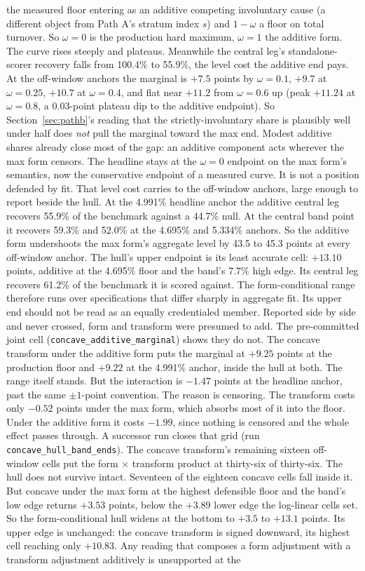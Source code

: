 \documentclass[12pt]{article}
\begin{document}
the measured floor entering as an additive competing involuntary cause (a different object from Path A's stratum index $s$) and $1-\omega$ a floor on total turnover. So $\omega = 0$ is the production hard maximum, $\omega = 1$ the additive form. The curve rises steeply and plateaus. Meanwhile the central leg's standalone-scorer recovery falls from 100.4\% to 55.9\%, the level cost the additive end pays. At the off-window anchors the marginal is $+7.5$ points by $\omega = 0.1$, $+9.7$ at $\omega = 0.25$, $+10.7$ at $\omega = 0.4$, and flat near $+11.2$ from $\omega = 0.6$ up (peak $+11.24$ at $\omega = 0.8$, a 0.03-point plateau dip to the additive endpoint). So Section~\ref{sec:pathb}'s reading that the strictly-involuntary share is plausibly well under half does \emph{not} pull the marginal toward the max end. Modest additive shares already close most of the gap: an additive component acts wherever the max form censors. The headline stays at the $\omega = 0$ endpoint on the max form's semantics, now the conservative endpoint of a measured curve. It is not a position defended by fit. That level cost carries to the off-window anchors, large enough to report beside the hull. At the 4.991\% headline anchor the additive central leg recovers 55.9\% of the benchmark against a 44.7\% null. At the central band point it recovers 59.3\% and 52.0\% at the 4.695\% and 5.334\% anchors. So the additive form undershoots the max form's aggregate level by 43.5 to 45.3 points at every off-window anchor. The hull's upper endpoint is its least accurate cell: $+13.10$ points, additive at the 4.695\% floor and the band's 7.7\% high edge. Its central leg recovers 61.2\% of the benchmark it is scored against. The form-conditional range therefore runs over specifications that differ sharply in aggregate fit. Its upper end should not be read as an equally credentialed member. Reported side by side and never crossed, form and transform were presumed to add. The pre-committed joint cell (\texttt{concave\_additive\_marginal}) shows they do not. The concave transform under the additive form puts the marginal at $+9.25$ points at the production floor and $+9.22$ at the 4.991\% anchor, inside the hull at both. The range itself stands. But the interaction is $-1.47$ points at the headline anchor, past the same $\pm 1$-point convention. The reason is censoring. The transform costs only $-0.52$ points under the max form, which absorbs most of it into the floor. Under the additive form it costs $-1.99$, since nothing is censored and the whole effect passes through. A successor run closes that grid (run \texttt{concave\_hull\_band\_ends}). The concave transform's remaining sixteen off-window cells put the form $\times$ transform product at thirty-six of thirty-six. The hull does not survive intact. Seventeen of the eighteen concave cells fall inside it. But concave under the max form at the highest defensible floor and the band's low edge returns $+3.53$ points, below the $+3.89$ lower edge the log-linear cells set. So the form-conditional hull widens at the bottom to $+3.5$ to $+13.1$ points. Its upper edge is unchanged: the concave transform is signed downward, its highest cell reaching only $+10.83$. Any reading that composes a form adjustment with a transform adjustment additively is unsupported at the 
\end{document}
